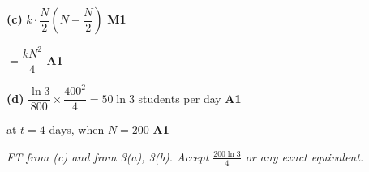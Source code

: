 \documentclass[12pt, twoside]{article}
\begin{document}
\begin{enumerate}[itemsep=0.3cm]
\textbf{(c)} $k \cdot \dfrac{N}{2}\left(N - \dfrac{N}{2}\right)$ \hfill \textbf{M1}

$= \dfrac{kN^{2}}{4}$ \hfill \textbf{A1}

\textbf{(d)} $\dfrac{\ln 3}{800} \times \dfrac{400^{2}}{4} = 50\ln 3$ students
per day \hfill \textbf{A1}

at $t = 4$ days, when $N = 200$ \hfill \textbf{A1}

\emph{FT from (c) and from 3(a), 3(b). Accept $\frac{200\ln 3}{4}$ or any
exact equivalent.}

\end{enumerate}
\end{document}
